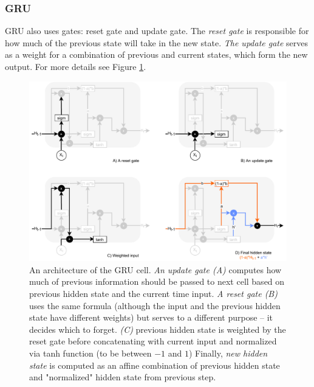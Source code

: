 \subsubsection*{GRU}
GRU also uses gates: reset gate and update gate.
The \textit{reset gate} is responsible for how much of the previous state will take in the new state.\textit{ The update gate} serves as a weight for a combination of previous and current states, which form the new output. For more details see Figure \ref{pic:gru_gates}.
\begin{figure}[H]
\centering
\includegraphics[width=1\columnwidth]{../img/gru_gates}
\protect\caption[An architecture of the GRU cell]{An architecture of the GRU cell. \textit{An update gate (A)} computes how much of previous information should be passed to next cell based on previous hidden state and the current time input. \textit{A reset gate (B)} uses the same formula (although the input and the previous hidden state have different weights) but serves to a different purpose -- it decides which to forget. \textit{(C)} previous hidden state is weighted by the reset gate before concatenating with current input and normalized via tanh function (to be between $-1$ and $1$) Finally, \textit{new hidden state} is computed as an affine combination of previous hidden state and "normalized" hidden state from previous step.}
\label{pic:gru_gates}
\end{figure}
